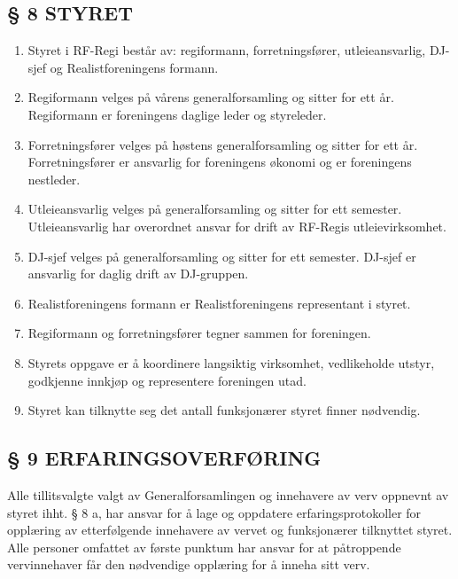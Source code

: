 \documentclass[a4paper,11pt,norsk]{scrartcl}
\begin{document}
\subsection{§ 8 STYRET%
  \label{styret}%
}

\begin{enumerate}
\renewcommand{\labelenumi}{\alph{enumi})}
\item Styret i RF-Regi består av: regiformann, forretningsfører, utleieansvarlig,
DJ-sjef og Realistforeningens formann.

\item Regiformann velges på vårens generalforsamling og sitter for ett år.
Regiformann er foreningens daglige leder og styreleder.

\item Forretningsfører velges på høstens generalforsamling og sitter for ett år.
Forretningsfører er ansvarlig for foreningens økonomi og er foreningens nestleder.

\item Utleieansvarlig velges på generalforsamling og sitter for ett semester.
Utleieansvarlig har overordnet ansvar for drift av RF-Regis utleievirksomhet.

\item DJ-sjef velges på generalforsamling og sitter for ett semester. DJ-sjef er
ansvarlig for daglig drift av DJ-gruppen.

\item Realistforeningens formann er Realistforeningens representant i styret.

\item Regiformann og forretningsfører tegner sammen for foreningen.

\item Styrets oppgave er å koordinere langsiktig virksomhet, vedlikeholde utstyr,
godkjenne innkjøp og representere foreningen utad.

\item Styret kan tilknytte seg det antall funksjonærer styret finner nødvendig.
\end{enumerate}


\subsection{§ 9 ERFARINGSOVERFØRING%
  \label{erfaringsoverforing}%
}

Alle tillitsvalgte valgt av
Generalforsamlingen og innehavere av verv oppnevnt av styret
ihht. § 8 a, har ansvar for å lage og oppdatere erfaringsprotokoller
for opplæring av etterfølgende innehavere av vervet og funksjonærer
tilknyttet styret. Alle personer omfattet av første punktum
har ansvar for at påtroppende vervinnehaver får den nødvendige
opplæring for å inneha sitt verv.
\end{document}
